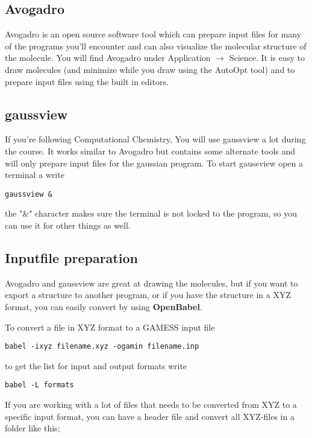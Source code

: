 \documentclass{article}
\begin{document}
\subsection*{Avogadro}

Avogadro is an open source software tool which can prepare input files for many of the programs you'll encounter and can also visualize the molecular structure of the molecule.
You will find Avogadro under Application $\rightarrow$ Science.
It is easy to draw molecules (and minimize while you draw using the AutoOpt tool) and to prepare input files using the built in editors.

\subsection*{gaussview}

If you're following Computational Chemistry, You will use gaussview a lot during the course.
It works similar to Avogadro but contains some alternate tools and will only prepare input files for the gaussian program.
To start gaussview open a terminal a write
\begin{lstlisting}
gaussview &
\end{lstlisting}

the "\&" character makes sure the terminal is not locked to the program, so you can use it for other things as well.


\subsection*{Inputfile preparation}

Avogadro and gaussview are great at drawing the molecules, but if you want to export a structure to another program, or if you have the structure in a XYZ format, you can easily convert by using {\bf OpenBabel}.

To convert a file in XYZ format to a GAMESS input file
\begin{lstlisting}
babel -ixyz filename.xyz -ogamin filename.inp
\end{lstlisting}

to get the list for input and output formats write

\begin{lstlisting}
babel -L formats
\end{lstlisting}

If you are working with a lot of files that needs to be converted from XYZ to a specific input format, you can have a header file  and convert all XYZ-files in a folder like this;
\end{document}
